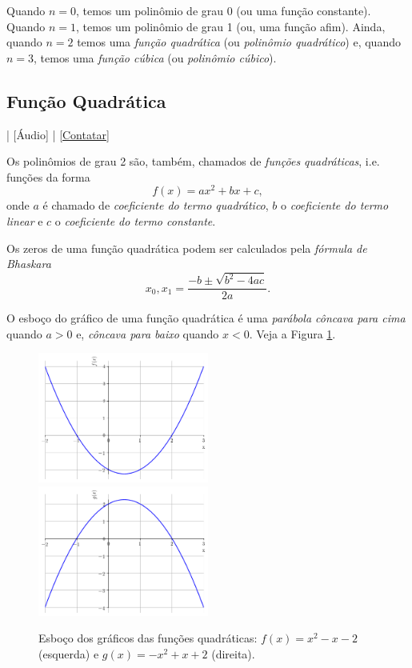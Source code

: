 Quando $n=0$, temos um polinômio de grau 0 (ou uma função constante). Quando $n=1$, temos um polinômio de grau 1 (ou, uma função afim). Ainda, quando $n=2$ temos uma \emph{função quadrática} (ou \emph{polinômio quadrático}) e, quando $n=3$, temos uma \emph{função cúbica} (ou \emph{polinômio cúbico}).

\subsection{Função Quadrática}

\begin{flushright}
  [Vídeo] | [Áudio] | \href{https://phkonzen.github.io/notas/contato.html}{[Contatar]}
\end{flushright}

Os polinômios de grau 2 são, também, chamados de \emph{funções quadráticas}, i.e. funções da forma
\begin{equation}
  f(x) = ax^2 + bx + c,
\end{equation}
onde $a$ é chamado de \emph{coeficiente do termo quadrático}, $b$ o \emph{coeficiente do termo linear} e $c$ o \emph{coeficiente do termo constante}.

Os zeros de uma função quadrática podem ser calculados pela \emph{fórmula de Bhaskara}
\begin{equation}\label{eq:Bhaskara}
  x_0, x_1 = \frac{-b \pm \sqrt{b^2 - 4ac}}{2a}.
\end{equation}


O esboço do gráfico de uma função quadrática é uma \emph{parábola côncava para cima} quando $a > 0$ e, \emph{côncava para baixo} quando $x < 0$. Veja a Figura \ref{fig:funquad_concavidade}.

\begin{figure}[H]
  \centering
  \includegraphics[width=0.5\textwidth]{./cap_funcao/dados/fig_funquad_concavidade/fig_funquad_concavidade_cima}~
    \includegraphics[width=0.5\textwidth]{./cap_funcao/dados/fig_funquad_concavidade/fig_funquad_concavidade_baixo}
  \caption{Esboço dos gráficos das funções quadráticas: $f(x) = x^2-x-2$ (esquerda) e $g(x)=-x^2+x+2$ (direita).}
  \label{fig:funquad_concavidade}
\end{figure}

